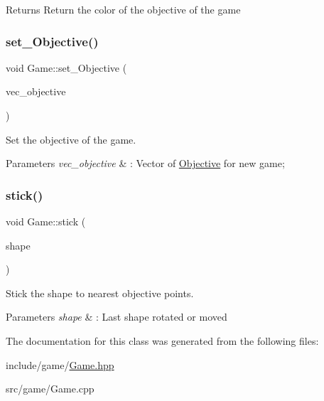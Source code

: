 \begin{DoxyReturn}{Returns}
Return the color of the objective of the game 
\end{DoxyReturn}
\mbox{\label{classGame_af8d3ef359625e4179d54f5dd956a0df5}} 
\subsubsection{\texorpdfstring{set\+\_\+\+Objective()}{set\_Objective()}}
{\footnotesize\ttfamily void Game\+::set\+\_\+\+Objective (\begin{DoxyParamCaption}\item[{const std\+::vector$<$ std\+::shared\+\_\+ptr$<$ \hyperlink{classShape}{Shape} $>$$>$ \&}]{vec\+\_\+objective }\end{DoxyParamCaption})}



Set the objective of the game. 


\begin{DoxyParams}{Parameters}
{\em vec\+\_\+objective} & \+: Vector of \hyperlink{classObjective}{Objective} for new game; \\
\hline
\end{DoxyParams}
\mbox{\label{classGame_a54ea3746d3738423197219af2d508188}} 
\subsubsection{\texorpdfstring{stick()}{stick()}}
{\footnotesize\ttfamily void Game\+::stick (\begin{DoxyParamCaption}\item[{const std\+::shared\+\_\+ptr$<$ \hyperlink{classShape}{Shape} $>$ \&}]{shape }\end{DoxyParamCaption})}



Stick the shape to nearest objective points. 


\begin{DoxyParams}{Parameters}
{\em shape} & \+: Last shape rotated or moved \\
\hline
\end{DoxyParams}


The documentation for this class was generated from the following files\+:\begin{DoxyCompactItemize}
\item 
include/game/\hyperlink{Game_8hpp}{Game.\+hpp}\item 
src/game/Game.\+cpp\end{DoxyCompactItemize}
